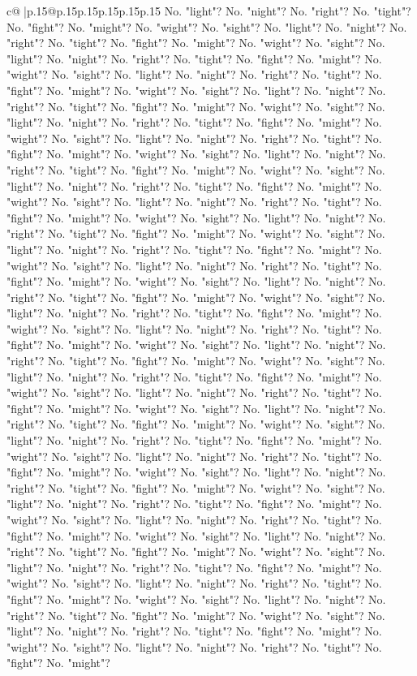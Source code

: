 \documentclass{article}
\begin{document}
{\begin{supertabular}{c@{$\;$}|p{.15\linewidth}@{}p{.15\linewidth}p{.15\linewidth}p{.15\linewidth}p{.15\linewidth}p{.15\linewidth}}
{{{No. "light"? No. "night"? No. "right"? No. "tight"? No. "fight"? No. "might"? No. "wight"? No. "sight"? No. "light"? No. "night"? No. "right"? No. "tight"? No. "fight"? No. "might"? No. "wight"? No. "sight"? No. "light"? No. "night"? No. "right"? No. "tight"? No. "fight"? No. "might"? No. "wight"? No. "sight"? No. "light"? No. "night"? No. "right"? No. "tight"? No. "fight"? No. "might"? No. "wight"? No. "sight"? No. "light"? No. "night"? No. "right"? No. "tight"? No. "fight"? No. "might"? No. "wight"? No. "sight"? No. "light"? No. "night"? No. "right"? No. "tight"? No. "fight"? No. "might"? No. "wight"? No. "sight"? No. "light"? No. "night"? No. "right"? No. "tight"? No. "fight"? No. "might"? No. "wight"? No. "sight"? No. "light"? No. "night"? No. "right"? No. "tight"? No. "fight"? No. "might"? No. "wight"? No. "sight"? No. "light"? No. "night"? No. "right"? No. "tight"? No. "fight"? No. "might"? No. "wight"? No. "sight"? No. "light"? No. "night"? No. "right"? No. "tight"? No. "fight"? No. "might"? No. "wight"? No. "sight"? No. "light"? No. "night"? No. "right"? No. "tight"? No. "fight"? No. "might"? No. "wight"? No. "sight"? No. "light"? No. "night"? No. "right"? No. "tight"? No. "fight"? No. "might"? No. "wight"? No. "sight"? No. "light"? No. "night"? No. "right"? No. "tight"? No. "fight"? No. "might"? No. "wight"? No. "sight"? No. "light"? No. "night"? No. "right"? No. "tight"? No. "fight"? No. "might"? No. "wight"? No. "sight"? No. "light"? No. "night"? No. "right"? No. "tight"? No. "fight"? No. "might"? No. "wight"? No. "sight"? No. "light"? No. "night"? No. "right"? No. "tight"? No. "fight"? No. "might"? No. "wight"? No. "sight"? No. "light"? No. "night"? No. "right"? No. "tight"? No. "fight"? No. "might"? No. "wight"? No. "sight"? No. "light"? No. "night"? No. "right"? No. "tight"? No. "fight"? No. "might"? No. "wight"? No. "sight"? No. "light"? No. "night"? No. "right"? No. "tight"? No. "fight"? No. "might"? No. "wight"? No. "sight"? No. "light"? No. "night"? No. "right"? No. "tight"? No. "fight"? No. "might"? No. "wight"? No. "sight"? No. "light"? No. "night"? No. "right"? No. "tight"? No. "fight"? No. "might"? No. "wight"? No. "sight"? No. "light"? No. "night"? No. "right"? No. "tight"? No. "fight"? No. "might"? No. "wight"? No. "sight"? No. "light"? No. "night"? No. "right"? No. "tight"? No. "fight"? No. "might"? No. "wight"? No. "sight"? No. "light"? No. "night"? No. "right"? No. "tight"? No. "fight"? No. "might"? No. "wight"? No. "sight"? No. "light"? No. "night"? No. "right"? No. "tight"? No. "fight"? No. "might"? No. "wight"? No. "sight"? No. "light"? No. "night"? No. "right"? No. "tight"? No. "fight"? No. "might"? No. "wight"? No. "sight"? No. "light"? No. "night"? No. "right"? No. "tight"? No. "fight"? No. "might"? No. "wight"? No. "sight"? No. "light"? No. "night"? No. "right"? No. "tight"? No. "fight"? No. "might"? No. "wight"? No. "sight"? No. "light"? No. "night"? No. "right"? No. "tight"? No. "fight"? No. "might"? No. "wight"? No. "sight"? No. "light"? No. "night"? No. "right"? No. "tight"? No. "fight"? No. "might"? No. "wight"? No. "sight"? No. "light"? No. "night"? No. "right"? No. "tight"? No. "fight"? No. "might"? }}}
\end{supertabular}}
\end{document}
